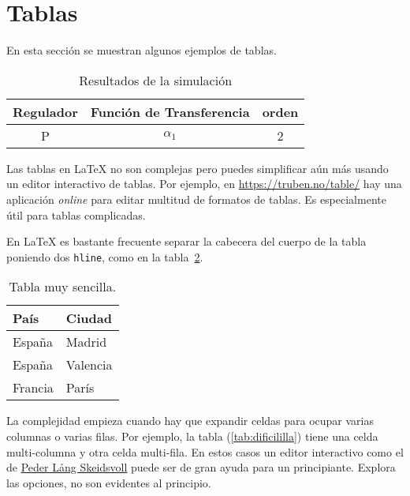 \section{Tablas} 
\label{sec:tablas}

En esta sección se muestran algunos ejemplos de tablas.

\begin{table}[htb]
\centering
\vspace{2mm}
\begin{tabular}{|c|c|c|}
\hline
 Regulador & Función de Transferencia & orden  \\
 \hline
 P         & $\alpha_1$               & 2      \\
 \hline
\end{tabular}
\caption{Resultados de la simulación}
\label{tab:resultados-simulacion}
\end{table}

Las tablas en \LaTeX{} no son complejas pero puedes simplificar aún más usando un editor interactivo de tablas.  Por ejemplo, en \url{https://truben.no/table/} hay una aplicación \emph{online} para editar multitud de formatos de tablas.  Es especialmente útil para tablas complicadas.

En \LaTeX{} es bastante frecuente separar la cabecera del cuerpo de la tabla poniendo dos \texttt{hline}, como en la tabla~\ref{tab:sencilla}.

\begin{table}[htb]
\begin{center}
\begin{tabular}{|l|l|}
\hline
País     &    Ciudad \\ \hline \hline
España   &    Madrid \\ \hline
España   &    Valencia \\ \hline
Francia  &    París \\ \hline
\end{tabular}
\caption{Tabla muy sencilla.}
\label{tab:sencilla}
\end{center}
\end{table}

La complejidad empieza cuando hay que expandir celdas para ocupar varias columnas o varias filas.  Por ejemplo, la tabla (\ref{tab:dificililla}) tiene una celda multi-columna y otra celda multi-fila.  En estos casos un editor interactivo como el de \href{https://truben.no/table/}{Peder Lång Skeidsvoll} puede ser de gran ayuda para un principiante.  Explora las opciones, no son evidentes al principio.

